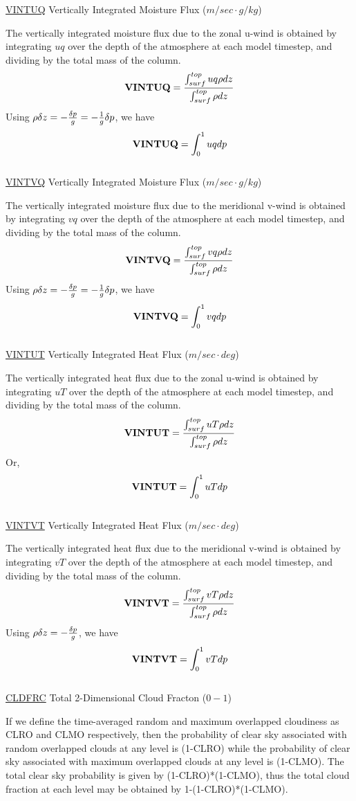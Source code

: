 \noindent
{ \underline {VINTUQ} Vertically Integrated Moisture Flux ($m/sec \cdot g/kg$) }

\noindent
The vertically integrated moisture flux due to the zonal u-wind is obtained by integrating
$u q$ over the depth of the atmosphere at each model timestep, 
and dividing by the total mass of the column.
\[
{\bf VINTUQ} = \frac{ \int_{surf}^{top} u q \rho dz  } { \int_{surf}^{top} \rho dz  }
\]
Using $\rho \delta z = -{\delta p \over g} = - {1 \over g} \delta p$, we have 
\[
{\bf VINTUQ} = { \int_0^1 u q dp  }
\]
\\


\noindent
{ \underline {VINTVQ} Vertically Integrated Moisture Flux ($m/sec \cdot g/kg$) }

\noindent
The vertically integrated moisture flux due to the meridional v-wind is obtained by integrating
$v q$ over the depth of the atmosphere at each model timestep, 
and dividing by the total mass of the column.
\[
{\bf VINTVQ} = \frac{ \int_{surf}^{top} v q \rho dz  } { \int_{surf}^{top} \rho dz  }
\]
Using $\rho \delta z = -{\delta p \over g} = - {1 \over g} \delta p$, we have 
\[
{\bf VINTVQ} = { \int_0^1 v q dp  }
\]
\\


\noindent
{ \underline {VINTUT} Vertically Integrated Heat Flux ($m/sec \cdot deg$) }

\noindent
The vertically integrated heat flux due to the zonal u-wind is obtained by integrating
$u T$ over the depth of the atmosphere at each model timestep, 
and dividing by the total mass of the column.
\[
{\bf VINTUT} = \frac{ \int_{surf}^{top} u T \rho dz  } { \int_{surf}^{top} \rho dz  }
\]
Or,
\[
{\bf VINTUT} = { \int_0^1 u T dp  }
\]
\\

\noindent
{ \underline {VINTVT} Vertically Integrated Heat Flux ($m/sec \cdot deg$) }

\noindent
The vertically integrated heat flux due to the meridional v-wind is obtained by integrating
$v T$ over the depth of the atmosphere at each model timestep, 
and dividing by the total mass of the column.
\[
{\bf VINTVT} = \frac{ \int_{surf}^{top} v T \rho dz  } { \int_{surf}^{top} \rho dz  }
\]
Using $\rho \delta z = -{\delta p \over g} $, we have 
\[
{\bf VINTVT} = { \int_0^1 v T dp  }
\]
\\

\noindent
{ \underline {CLDFRC} Total 2-Dimensional Cloud Fracton ($0-1$) }

If we define the
time-averaged random and maximum overlapped cloudiness as CLRO and
CLMO respectively, then the probability of clear sky associated 
with random overlapped clouds at any level is (1-CLRO) while the probability of
clear sky associated with maximum overlapped clouds at any level is (1-CLMO). 
The total clear sky probability is given by (1-CLRO)*(1-CLMO), thus
the total cloud fraction at each  level may be obtained by 
1-(1-CLRO)*(1-CLMO).

